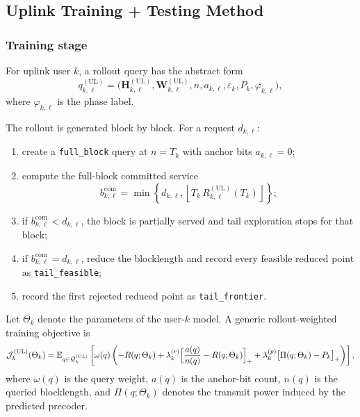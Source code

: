 \documentclass[11pt]{article}
\newcommand{\Qset}{\mathcal{Q}}
\newcommand{\Hc}{\mathbf{H}}
\newcommand{\Wmat}{\mathbf{W}}
\newcommand{\floor}[1]{\left\lfloor #1 \right\rfloor}
\newcommand{\UL}{\mathrm{UL}}
\newcommand{\E}{\mathbb{E}}
\begin{document}
\subsection{Uplink Training + Testing Method}

\subsubsection{Training stage}

For uplink user $k$, a rollout query has the abstract form
\begin{equation}
q_{k,\ell}^{(\UL)}
=
\bigl(
\Hc_{k,\ell}^{(\UL)},
\Wmat_{k,\ell}^{(\UL)},
n,
a_{k,\ell},
\varepsilon_k,
P_k,
\varphi_{k,\ell}
\bigr),
\label{eq:ul-query}
\end{equation}
where $\varphi_{k,\ell}$ is the phase label.

The rollout is generated block by block. For a request $d_{k,\ell}$:
\begin{enumerate}
    \item create a \texttt{full\_block} query at $n=T_k$ with anchor bits $a_{k,\ell}=0$;
    \item compute the full-block committed service
    \begin{equation}
    b_{k,\ell}^{\mathrm{com}}
    =
    \min\!\left\{
    d_{k,\ell},
    \floor{T_k\,R_{k,\ell}^{(\UL)}(T_k)}
    \right\};
    \label{eq:ul-committed-bits}
    \end{equation}
    \item if $b_{k,\ell}^{\mathrm{com}}<d_{k,\ell}$, the block is partially served and tail exploration stops for that block;
    \item if $b_{k,\ell}^{\mathrm{com}}=d_{k,\ell}$, reduce the blocklength and record every feasible reduced point as \texttt{tail\_feasible};
    \item record the first rejected reduced point as \texttt{tail\_frontier}.
\end{enumerate}

Let $\Theta_k$ denote the parameters of the user-$k$ model. A generic
rollout-weighted training objective is
\begin{equation}
\mathcal{J}_k^{(\UL)}(\Theta_k)
=
\E_{q\in\Qset_k^{(\UL)}}
\left[
\omega(q)
\left(
-R(q;\Theta_k)
+
\lambda_k^{(r)}\Bigl[\frac{a(q)}{n(q)}-R(q;\Theta_k)\Bigr]_+
+
\lambda_k^{(p)}\bigl[\Pi(q;\Theta_k)-P_k\bigr]_+
\right)
\right],
\label{eq:ul-training-objective}
\end{equation}
where $\omega(q)$ is the query weight, $a(q)$ is the anchor-bit count,
$n(q)$ is the queried blocklength, and $\Pi(q;\Theta_k)$ denotes the transmit
power induced by the predicted precoder.
\end{document}
